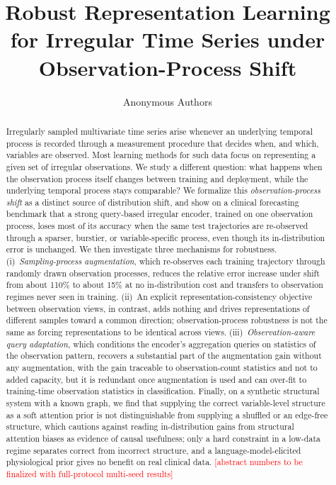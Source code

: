 \documentclass[sigconf,nonacm]{acmart}
\newcommand{\todo}[1]{\textcolor{red}{[#1]}}
\begin{document}
\title{Robust Representation Learning for Irregular Time Series under Observation-Process Shift}

\author{Anonymous Authors}

\begin{abstract}
Irregularly sampled multivariate time series arise whenever an underlying temporal process is recorded through a
measurement procedure that decides when, and which, variables are observed. Most learning methods for such data
focus on representing a given set of irregular observations. We study a different question: what happens when the
observation process itself changes between training and deployment, while the underlying temporal process stays
comparable? We formalize this \emph{observation-process shift} as a distinct source of distribution shift, and show
on a clinical forecasting benchmark that a strong query-based irregular encoder, trained on one observation
process, loses most of its accuracy when the same test trajectories are re-observed through a sparser, burstier,
or variable-specific process, even though its in-distribution error is unchanged. We then investigate three
mechanisms for robustness. (i)~\emph{Sampling-process augmentation}, which re-observes each training trajectory
through randomly drawn observation processes, reduces the relative error increase under shift from about 110\% to
about 15\% at no in-distribution cost and transfers to observation regimes never seen in training.
(ii)~An explicit representation-consistency objective between observation views, in contrast, adds nothing and
drives representations of different samples toward a common direction; observation-process robustness is not the
same as forcing representations to be identical across views. (iii)~\emph{Observation-aware query adaptation},
which conditions the encoder's aggregation queries on statistics of the observation pattern, recovers a substantial
part of the augmentation gain without any augmentation, with the gain traceable to observation-count statistics and
not to added capacity, but it is redundant once augmentation is used and can over-fit to training-time observation
statistics in classification. Finally, on a synthetic structural system with a known graph, we find that supplying
the correct variable-level structure as a soft attention prior is not distinguishable from supplying a shuffled or
an edge-free structure, which cautions against reading in-distribution gains from structural attention biases as
evidence of causal usefulness; only a hard constraint in a low-data regime separates correct from incorrect
structure, and a language-model-elicited physiological prior gives no benefit on real clinical data.
\todo{abstract numbers to be finalized with full-protocol multi-seed results}
\end{abstract}
\end{document}

